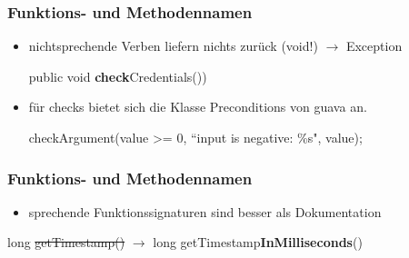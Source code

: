 \begin{frame}
  \frametitle{Funktions- und Methodennamen}
  \begin{itemize}
  \item nichtsprechende Verben liefern nichts zurück (void!) $\rightarrow$ Exception
  \begin{Beispiel}
  \par public void \textbf{check}Credentials())
  \end{Beispiel} 
  
  \item für checks bietet sich die Klasse Preconditions von guava an.
  \begin{Beispiel}
  \par checkArgument(value >= 0, ``input is negative: \%s", value);
  \end{Beispiel}
  \end{itemize}

\end{frame}

\begin{frame}
\frametitle{Funktions- und Methodennamen}
  \begin{itemize}
    \item sprechende Funktionssignaturen sind besser als Dokumentation
    \end{itemize}
  \begin{Beispiel}
  \par long \sout{getTimestamp()} $\rightarrow$ long getTimestamp\textbf{InMilliseconds}()
  \end{Beispiel}

\end{frame}